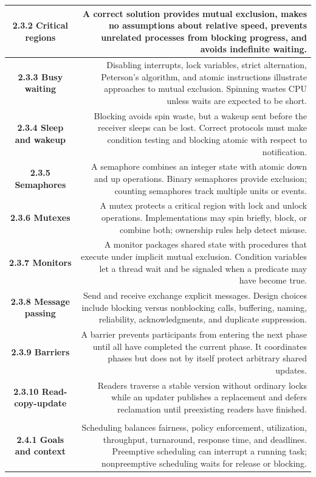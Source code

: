 \documentclass[10pt,letterpaper]{article}
\begin{document}
\begin{longtable}{C N}
\textbf{2.3.2 Critical regions} & A correct solution provides mutual exclusion, makes no assumptions about relative speed, prevents unrelated processes from blocking progress, and avoids indefinite waiting.\\\hline
\textbf{2.3.3 Busy waiting} & Disabling interrupts, lock variables, strict alternation, Peterson's algorithm, and atomic instructions illustrate approaches to mutual exclusion. Spinning wastes CPU unless waits are expected to be short.\\\hline
\textbf{2.3.4 Sleep and wakeup} & Blocking avoids spin waste, but a wakeup sent before the receiver sleeps can be lost. Correct protocols must make condition testing and blocking atomic with respect to notification.\\\hline
\textbf{2.3.5 Semaphores} & A semaphore combines an integer state with atomic down and up operations. Binary semaphores provide exclusion; counting semaphores track multiple units or events.\\\hline
\textbf{2.3.6 Mutexes} & A mutex protects a critical region with lock and unlock operations. Implementations may spin briefly, block, or combine both; ownership rules help detect misuse.\\\hline
\textbf{2.3.7 Monitors} & A monitor packages shared state with procedures that execute under implicit mutual exclusion. Condition variables let a thread wait and be signaled when a predicate may have become true.\\\hline
\textbf{2.3.8 Message passing} & Send and receive exchange explicit messages. Design choices include blocking versus nonblocking calls, buffering, naming, reliability, acknowledgments, and duplicate suppression.\\\hline
\textbf{2.3.9 Barriers} & A barrier prevents participants from entering the next phase until all have completed the current phase. It coordinates phases but does not by itself protect arbitrary shared updates.\\\hline
\textbf{2.3.10 Read-copy-update} & Readers traverse a stable version without ordinary locks while an updater publishes a replacement and defers reclamation until preexisting readers have finished.\\\hline
{}\\*\hline
\textbf{2.4.1 Goals and context} & Scheduling balances fairness, policy enforcement, utilization, throughput, turnaround, response time, and deadlines. Preemptive scheduling can interrupt a running task; nonpreemptive scheduling waits for release or blocking.\\\hline

\end{longtable}
\end{document}
